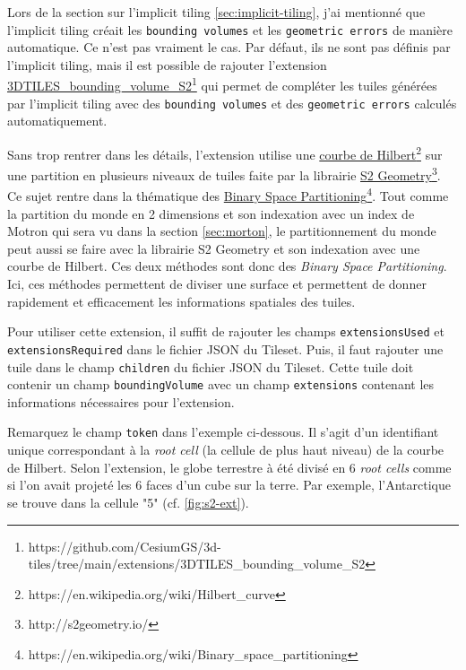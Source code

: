 Lors de la section sur l'implicit tiling \autoref{sec:implicit-tiling}, j'ai mentionné que l'implicit tiling créait les \texttt{bounding volumes} et les \texttt{geometric errors} de manière automatique. Ce n'est pas vraiment le cas. Par défaut, ils ne sont pas définis par l'implicit tiling, mais il est possible de rajouter l'extension \href{https://github.com/CesiumGS/3d-tiles/tree/main/extensions/3DTILES_bounding_volume_S2}{3DTILES\_bounding\_volume\_S2}\footnote{https://github.com/CesiumGS/3d-tiles/tree/main/extensions/3DTILES\_bounding\_volume\_S2} qui permet de compléter les tuiles générées par l'implicit tiling avec des \texttt{bounding volumes} et des \texttt{geometric errors} calculés automatiquement.

Sans trop rentrer dans les détails, l'extension utilise une \href{https://en.wikipedia.org/wiki/Hilbert_curve}{courbe de Hilbert}\footnote{https://en.wikipedia.org/wiki/Hilbert\_curve} sur une partition en plusieurs niveaux de tuiles faite par la librairie \href{http://s2geometry.io/}{S2 Geometry}\footnote{http://s2geometry.io/}. Ce sujet rentre dans la thématique des \href{https://en.wikipedia.org/wiki/Binary_space_partitioning}{Binary Space Partitioning}\footnote{https://en.wikipedia.org/wiki/Binary\_space\_partitioning}. Tout comme la partition du monde en 2 dimensions et son indexation avec un index de Motron qui sera vu dans la section \ref{sec:morton}, le partitionnement du monde peut aussi se faire avec la librairie S2 Geometry et son indexation avec une courbe de Hilbert. Ces deux méthodes sont donc des \textit{Binary Space Partitioning}. Ici, ces méthodes permettent de diviser une surface et permettent de donner rapidement et efficacement les informations spatiales des tuiles.

Pour utiliser cette extension, il suffit de rajouter les champs \texttt{extensionsUsed} et \texttt{extensionsRequired} dans le fichier JSON du Tileset. Puis, il faut rajouter une tuile dans le champ \texttt{children} du fichier JSON du Tileset. Cette tuile doit contenir un champ \texttt{boundingVolume} avec un champ \texttt{extensions} contenant les informations nécessaires pour l'extension.

Remarquez le champ \texttt{token} dans l'exemple ci-dessous. Il s'agit d'un identifiant unique correspondant à la \textit{root cell} (la cellule de plus haut niveau) de la courbe de Hilbert. Selon l'extension, le globe terrestre à été divisé en 6 \textit{root cells} comme si l'on avait projeté les 6 faces d'un cube sur la terre. Par exemple, l'Antarctique se trouve dans la cellule "5" (cf. \autoref{fig:s2-ext}).


